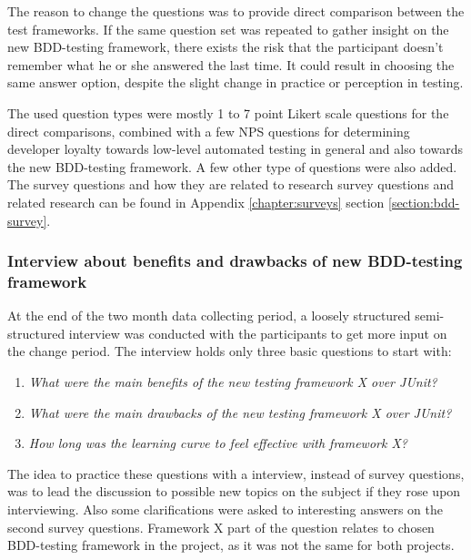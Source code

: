     The reason to change the questions was to provide direct comparison between the test frameworks.
    If the same question set was repeated to gather insight on the new BDD-testing framework, there exists the risk that
    the participant doesn't remember what he or she answered the last time. It could result in choosing the same answer option,
    despite the slight change in practice or perception in testing.

    The used question types were mostly 1 to 7 point Likert scale questions for the direct comparisons, combined with a few NPS questions for
    determining developer loyalty towards low-level automated testing in general and also towards the new BDD-testing framework.
    A few other type of questions were also added.
    The survey questions and how they are related to research survey questions and related research can be found
    in Appendix \ref{chapter:surveys} section \ref{section:bdd-survey}.

    \subsubsection{Interview about benefits and drawbacks of new BDD-testing framework}
    At the end of the two month data collecting period, a loosely structured semi-structured interview was conducted with the participants
    to get more input on the change period. The interview holds only three basic questions to start with:
    \begin{enumerate}
    \item \textit{What were the main benefits of the new testing framework X over JUnit?}
    \item \textit{What were the main drawbacks of the new testing framework X over JUnit?}
    \item \textit{How long was the learning curve to feel effective with framework X?}
    \end{enumerate}
    The idea to practice these questions with a interview, instead of survey questions, was to lead the discussion
    to possible new topics on the subject if they rose upon interviewing. Also some clarifications were asked to interesting
    answers on the second survey questions. Framework X part of the question relates
    to chosen BDD-testing framework in the project, as it was not the same for both projects.


